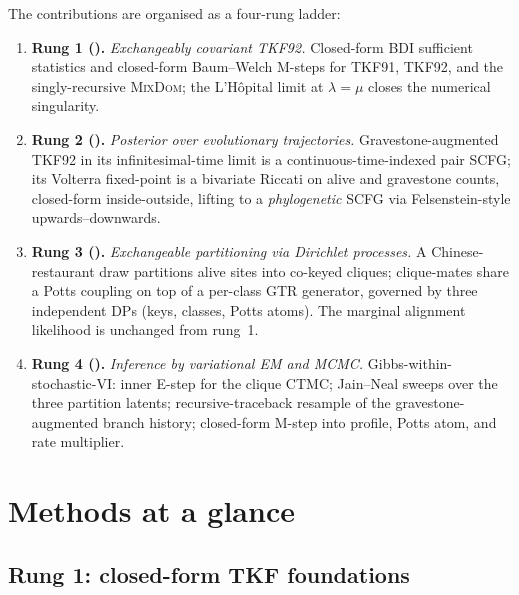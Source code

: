 \documentclass[11pt]{article}
\theoremstyle{definition}
\theoremstyle{remark}
\newcommand{\MixDom}{\textsc{MixDom}}
\begin{document}
The contributions are organised as a four-rung ladder:
\begin{enumerate}
\item \textbf{Rung 1 ().} \emph{Exchangeably covariant
  TKF92.} Closed-form BDI sufficient statistics and closed-form
  Baum--Welch M-steps for TKF91, TKF92, and the singly-recursive
  \MixDom; the L'H\^opital limit at $\lambda{=}\mu$ closes the
  numerical singularity.
\item \textbf{Rung 2 ().} \emph{Posterior over
  evolutionary trajectories.} Gravestone-augmented TKF92 in its
  infinitesimal-time limit is a continuous-time-indexed pair SCFG;
  its Volterra fixed-point is a bivariate Riccati on alive and
  gravestone counts, closed-form inside-outside, lifting to a
  \emph{phylogenetic} SCFG via Felsenstein-style upwards--downwards.
\item \textbf{Rung 3 ().} \emph{Exchangeable
  partitioning via Dirichlet processes.} A Chinese-restaurant draw
  partitions alive sites into co-keyed cliques; clique-mates share a
  Potts coupling on top of a per-class GTR generator, governed by
  three independent DPs (keys, classes, Potts atoms). The marginal
  alignment likelihood is unchanged from rung~1.
\item \textbf{Rung 4 ().} \emph{Inference by
  variational EM and MCMC.} Gibbs-within-stochastic-VI:
  inner E-step for the clique CTMC; Jain--Neal sweeps over the
  three partition latents; recursive-traceback resample of the
  gravestone-augmented branch history; closed-form M-step into
  profile, Potts atom, and rate multiplier.
\end{enumerate}

\section{Methods at a glance}
\label{sec:methods}

\subsection{Rung 1: closed-form TKF foundations}
\label{sec:rung1}
\end{document}
